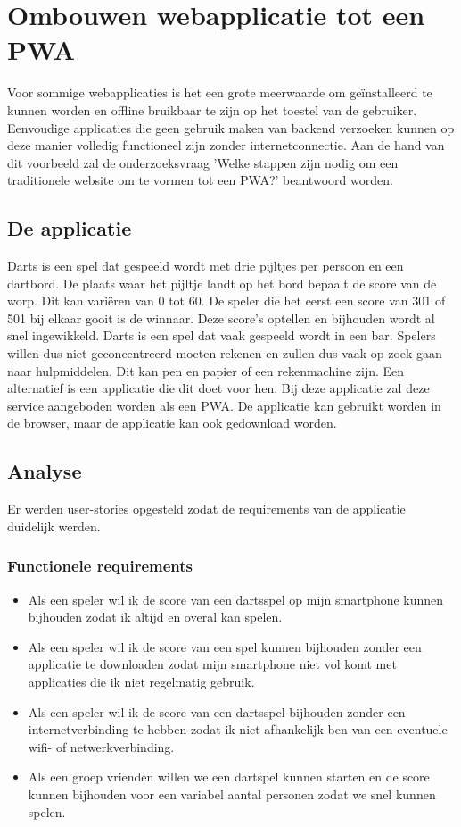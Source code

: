 \chapter{Ombouwen webapplicatie tot een PWA}
\label{ch:TransformerenNaarEenPWA}

Voor sommige webapplicaties is het een grote meerwaarde om geïnstalleerd te kunnen worden  en offline bruikbaar te zijn op het toestel van de gebruiker. \autocite{Mozilla2020c} Eenvoudige applicaties die geen gebruik maken van backend verzoeken kunnen op deze manier volledig functioneel zijn zonder internetconnectie. 
Aan de hand van dit voorbeeld zal de onderzoeksvraag 'Welke stappen zijn nodig om een traditionele website om te vormen tot een PWA?' beantwoord worden.

\section{De applicatie}

	Darts is een spel dat gespeeld wordt met drie pijltjes per persoon en een dartbord. De plaats waar het pijltje landt op het bord bepaalt de score van de worp. Dit kan variëren van 0 tot 60. De speler die het eerst een score van 301 of  501 bij elkaar gooit is de winnaar. Deze score’s optellen en bijhouden wordt al snel ingewikkeld. Darts is een spel dat vaak gespeeld wordt in een bar. Spelers willen dus niet geconcentreerd moeten rekenen en zullen dus vaak op zoek gaan naar hulpmiddelen. Dit kan pen en papier of een rekenmachine zijn. Een alternatief is een applicatie die dit doet voor hen. Bij deze applicatie zal deze service aangeboden worden als een PWA. De applicatie kan gebruikt worden in de browser, maar de applicatie kan ook gedownload worden.
	
\section{Analyse}

	Er werden user-stories opgesteld zodat de requirements van de applicatie duidelijk werden.  
	
	\subsection{Functionele requirements}
		\begin{itemize}
			 \item 	Als een speler wil ik de score van een dartsspel op mijn smartphone kunnen bijhouden zodat ik altijd en overal kan spelen.
			 \item 	Als een speler wil ik de score van een spel kunnen bijhouden zonder een applicatie te downloaden zodat mijn smartphone niet vol komt met applicaties die ik niet regelmatig gebruik.
			 \item 	Als een speler wil ik de score van een dartsspel bijhouden zonder een internetverbinding te hebben zodat ik niet afhankelijk ben van een eventuele wifi-  of netwerkverbinding.
			 \item 	Als een groep vrienden willen we een dartspel kunnen starten en de score kunnen bijhouden voor een variabel aantal personen zodat we snel kunnen spelen.
		\end{itemize}	
	
